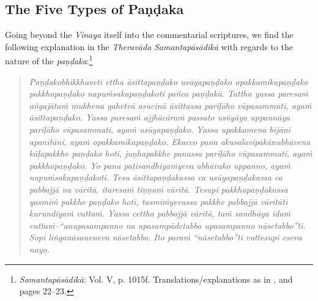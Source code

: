 \subsection{The Five Types of Paṇḍaka}
Going beyond the \textit{Vinaya} itself into the commentarial scriptures, we find the following explanation in the \textit{Theravāda} \textit{Samantapāsādikā} with regards to the nature of the \textit{paṇḍaka}:\footnote{\textit{Samantapāsādikā}: Vol. V, p. 1015f. Translations/explanations as in \cite{bomhard}, \cite{thanissaro} and \cite{artinger} pages 22–23.}

\begin{quote}
\textit{Paṇḍakobhikkhaveti ettha āsittapaṇḍako usūyapaṇḍako opakkamikapaṇḍako pakkhapaṇḍako napuṁsakapaṇḍakoti pañca paṇḍakā. Tattha yassa paresaṁ aṅgajātaṁ mukhena gahetvā asucinā āsittassa pariḷāho vūpasammati, ayaṁ āsittapaṇḍako. Yassa paresaṁ ajjhācāraṁ passato usūyāya uppannāya pariḷāho vūpasammati, ayaṁ usūyapaṇḍako. Yassa upakkamena bījāni apanītāni, ayaṁ opakkamikapaṇḍako. Ekacco pana akusalavipākānubhāvena kāḷapakkhe paṇḍako hoti, juṇhapakkhe panassa pariḷāho vūpasammati, ayaṁ pakkhapaṇḍako. Yo pana paṭisandhiyaṁyeva abhāvako uppanno, ayaṁ napuṁsakapaṇḍakoti. Tesu āsittapaṇḍakassa ca usūyapaṇḍakassa ca pabbajjā na vāritā, itaresaṁ tiṇṇaṁ vāritā. Tesupi pakkhapaṇḍakassa yasmiṁ pakkhe paṇḍako hoti, tasmiṁyevassa pakkhe pabbajjā vāritāti kurundiyaṁ vuttaṁ. Yassa cettha pabbajjā vāritā, taṁ sandhāya idaṁ vuttaṁ--``anupasampanno na upasampādetabbo upasampanno nāsetabbo''ti. Sopi liṅganāsaneneva nāsetabbo. Ito paraṁ ``nāsetabbo''ti vuttesupi eseva nayo.}
\end{quote}

